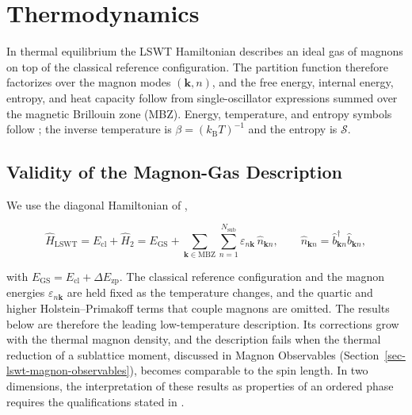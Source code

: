
\hypertarget{sec-lswt-thermodynamics}{%
\section{Thermodynamics}\label{sec-lswt-thermodynamics}}

In thermal equilibrium the LSWT Hamiltonian describes an ideal gas of magnons on top of the classical reference configuration. The partition function therefore factorizes over the magnon modes \((\mathbf k,n)\), and the free energy, internal energy, entropy, and heat capacity follow from single-oscillator expressions summed over the magnetic Brillouin zone (MBZ). Energy, temperature, and entropy symbols follow ; the inverse temperature is \(\beta=(k_{\mathrm B}T)^{-1}\) and the entropy is \(\mathcal S\).

\subsection{Validity of the Magnon-Gas Description}

We use the diagonal Hamiltonian of ,

\[
\hat H_{\mathrm{LSWT}}
=E_{\mathrm{cl}}+\hat H_2
=E_{\mathrm{GS}}+\sum_{\mathbf k\in\mathrm{MBZ}}\sum_{n=1}^{N_{\mathrm{sub}}}\varepsilon_{n\mathbf k}\,\hat n_{\mathbf kn},
\qquad
\hat n_{\mathbf kn}=\hat b_{\mathbf kn}^\dagger\hat b_{\mathbf kn},
\]

with \(E_{\mathrm{GS}}=E_{\mathrm{cl}}+\Delta E_{\mathrm{zp}}\). The classical reference configuration and the magnon energies \(\varepsilon_{n\mathbf k}\) are held fixed as the temperature changes, and the quartic and higher Holstein--Primakoff terms that couple magnons are omitted. The results below are therefore the leading low-temperature description. Its corrections grow with the thermal magnon density, and the description fails when the thermal reduction of a sublattice moment, discussed in Magnon Observables (Section~\ref{sec-lswt-magnon-observables}), becomes comparable to the spin length. In two dimensions, the interpretation of these results as properties of an ordered phase requires the qualifications stated in .

